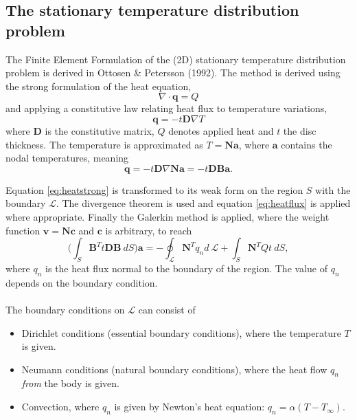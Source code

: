 \documentclass[a4paper,11pt]{article}
\begin{document}
\subsection{The stationary temperature distribution problem}
The Finite Element Formulation of the (2D) stationary temperature distribution problem is derived in Ottosen \& Petersson (1992). The method is derived using the strong formulation of the heat equation, 
\begin{equation} \label{eq:heatstrong}
    \nabla \cdot \boldsymbol q = Q
\end{equation}
and applying a constitutive law relating heat flux to temperature variations, 
\begin{equation}
    \boldsymbol q = -t\boldsymbol D\nabla T
\end{equation}
where $\boldsymbol{D}$ is the constitutive matrix, $Q$ denotes applied heat and $t$ the disc thickness. The temperature is approximated as $T=\boldsymbol{Na}$, where $\boldsymbol{a}$ contains the nodal temperatures, meaning
\begin{equation} \label{eq:heatflux}
    \boldsymbol{q} =-t \boldsymbol{D} \nabla \boldsymbol{Na} = -t \boldsymbol{DBa}.
\end{equation}

\bigskip \noindent Equation \ref{eq:heatstrong} is transformed to its weak form on the region $S$ with the boundary $\mathcal{L}$. The divergence theorem is used and equation \ref{eq:heatflux} is applied where appropriate. Finally the Galerkin method is applied, where the weight function $\boldsymbol{v} = \boldsymbol{Nc}$ and $\boldsymbol c$ is arbitrary, to reach
\begin{equation}
    \bigg ( \int_{S}\boldsymbol B^Tt\boldsymbol {DB} \: dS \bigg ) \boldsymbol a = -\oint_{\mathcal L}\boldsymbol N^Tq_nd \: \mathcal L + \int_S \boldsymbol N^T Qt \: dS,
\end{equation}
where $q_n$ is the heat flux normal to the boundary of the region. The value of $q_n$ depends on the boundary condition.\\
\\The boundary conditions on $\mathcal L$ can consist of
\begin{itemize}
    \item Dirichlet conditions (essential boundary conditions), where the temperature $T$ is given.
    \item Neumann conditions (natural boundary conditions), where the heat flow $q_n$ \textit{from} the body is given.
    \item Convection, where $q_n$ is given by Newton's heat equation: $q_n = \alpha(T-T_{\infty})$.
\end{itemize}
\end{document}
